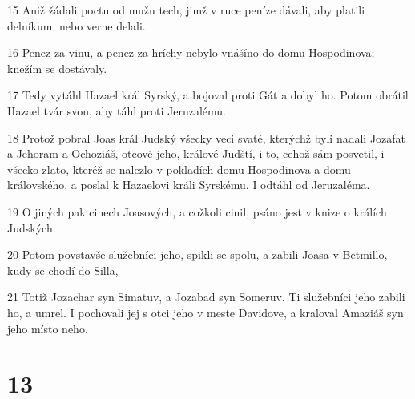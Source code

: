 \par 15 Aniž žádali poctu od mužu tech, jimž v ruce peníze dávali, aby platili delníkum; nebo verne delali.
\par 16 Penez za vinu, a penez za hríchy nebylo vnášíno do domu Hospodinova; knežím se dostávaly.
\par 17 Tedy vytáhl Hazael král Syrský, a bojoval proti Gát a dobyl ho. Potom obrátil Hazael tvár svou, aby táhl proti Jeruzalému.
\par 18 Protož pobral Joas král Judský všecky veci svaté, kterýchž byli nadali Jozafat a Jehoram a Ochoziáš, otcové jeho, králové Judští, i to, cehož sám posvetil, i všecko zlato, kteréž se nalezlo v pokladích domu Hospodinova a domu královského, a poslal k Hazaelovi králi Syrskému. I odtáhl od Jeruzaléma.
\par 19 O jiných pak cinech Joasových, a cožkoli cinil, psáno jest v knize o králích Judských.
\par 20 Potom povstavše služebníci jeho, spikli se spolu, a zabili Joasa v Betmillo, kudy se chodí do Silla,
\par 21 Totiž Jozachar syn Simatuv, a Jozabad syn Someruv. Ti služebníci jeho zabili ho, a umrel. I pochovali jej s otci jeho v meste Davidove, a kraloval Amaziáš syn jeho místo neho.

\chapter{13}

